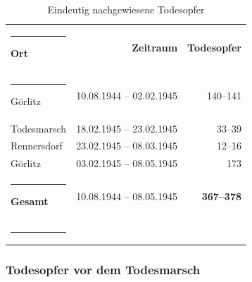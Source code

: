 \begin{table}
\label{opferzahlentab}
\centering
\begin{tabularx}{.8\textwidth}{Lrr}
\hrule
{\bf Ort} & {\bf Zeitraum} & {\bf Todesopfer} \\
\hrule
Görlitz & 10.08.1944 -- 02.02.1945 & 140--141\\
Todesmarsch & 18.02.1945 -- 23.02.1945 & 33--39\\
Rennersdorf & 23.02.1945 -- 08.03.1945 & 12--16\\
Görlitz & 03.02.1945 -- 08.05.1945 & 173\\
\hrule
{\bf Gesamt} & 10.08.1944 -- 08.05.1945	& {\bf 367--378}\\[0pt]
\hrule
\end{tabularx}
\caption{Eindeutig nachgewiesene Todesopfer}
\end{table}%


\subsubsection{Todesopfer vor dem Todesmarsch}


